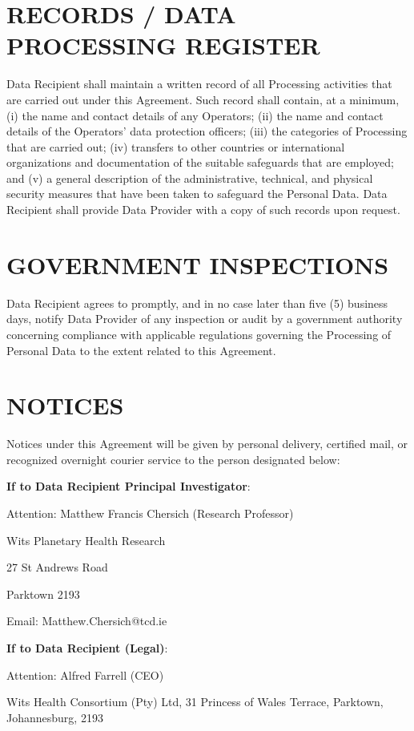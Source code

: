 \section{RECORDS / DATA PROCESSING REGISTER}

Data Recipient shall maintain a written record of all Processing activities that are carried out under this Agreement. Such record shall contain, at a minimum, (i) the name and contact details of any Operators; (ii) the name and contact details of the Operators' data protection officers; (iii) the categories of Processing that are carried out; (iv) transfers to other countries or international organizations and documentation of the suitable safeguards that are employed; and (v) a general description of the administrative, technical, and physical security measures that have been taken to safeguard the Personal Data. Data Recipient shall provide Data Provider with a copy of such records upon request.

\section{GOVERNMENT INSPECTIONS}

Data Recipient agrees to promptly, and in no case later than five (5) business days, notify Data Provider of any inspection or audit by a government authority concerning compliance with applicable regulations governing the Processing of Personal Data to the extent related to this Agreement.

\section{NOTICES}

Notices under this Agreement will be given by personal delivery, certified mail, or recognized overnight courier service to the person designated below:

\textbf{If to Data Recipient Principal Investigator}:

Attention: Matthew Francis Chersich (Research Professor)

Wits Planetary Health Research

27 St Andrews Road

Parktown 2193

Email: Matthew.Chersich@tcd.ie

\textbf{If to Data Recipient (Legal)}:

Attention: Alfred Farrell (CEO)

Wits Health Consortium (Pty) Ltd, 31 Princess of Wales Terrace, Parktown, Johannesburg, 2193

